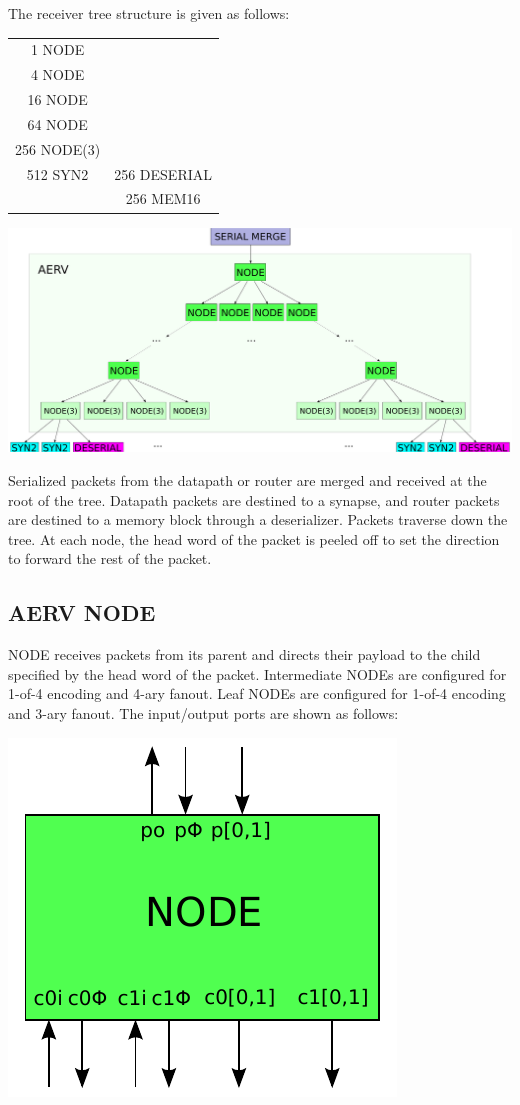 \documentclass{article}
\begin{document}
\noindent
The receiver tree structure is given as follows:

\begin{center}
    \begin{tabular}{cc}
        1 NODE & \\
        4 NODE & \\
        16 NODE & \\
        64 NODE & \\
        256 NODE(3) & \\
        512 SYN2 & 256 DESERIAL \\
        & 256 MEM16 \\
    \end{tabular}
\end{center}

\begin{center}
  \includegraphics[width=.8\textwidth]{img/aerv.pdf}
\end{center}
Serialized packets from the datapath or router are merged and received at the 
root of the tree.
Datapath packets are destined to a synapse, and router packets
are destined to a memory block through a deserializer. Packets
traverse down the tree. At each node, the head word of the packet is peeled
off to set the direction to forward the rest of the packet.

\subsection{AERV NODE \label{sec:AERV_NODE}}

NODE receives packets from its parent and directs their payload to the
child specified by the head word of the packet. Intermediate NODEs 
are configured for 1-of-4 encoding and 4-ary fanout. Leaf NODEs are configured
for 1-of-4 encoding and 3-ary fanout.
The input/output ports are shown as follows:

\begin{center}
  \includegraphics[width=.25\textwidth]{img/aerv_node.pdf}
\end{center}
\end{document}
